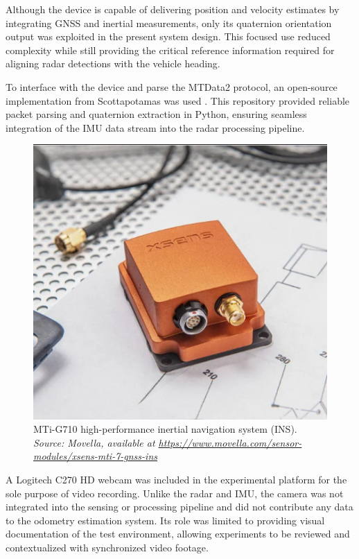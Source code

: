 Although the device is capable of delivering position and velocity estimates by integrating GNSS and inertial measurements, only its quaternion orientation output was exploited in the present system design.  
This focused use reduced complexity while still providing the critical reference information required for aligning radar detections with the vehicle heading.  

To interface with the device and parse the MTData2 protocol, an open-source implementation from Scottapotamas was used \cite{xsens_repo}.  
This repository provided reliable packet parsing and quaternion extraction in Python, ensuring seamless integration of the IMU data stream into the radar processing pipeline.  

\begin{figure}[!htbp]
    \centering
    \includegraphics[width=1.0\linewidth]{images/mti_g710.png}
    \caption{MTi-G710 high-performance inertial navigation system (INS).\\
    \textit{Source: Movella, available at \url{https://www.movella.com/sensor-modules/xsens-mti-7-gnss-ins}}}
    \label{fig:MTi-G710 sensor}
\end{figure}

A Logitech C270 HD webcam was included in the experimental platform for the sole purpose of video recording.  
Unlike the radar and IMU, the camera was not integrated into the sensing or processing pipeline and did not contribute any data to the odometry estimation system.  
Its role was limited to providing visual documentation of the test environment, allowing experiments to be reviewed and contextualized with synchronized video footage.  

